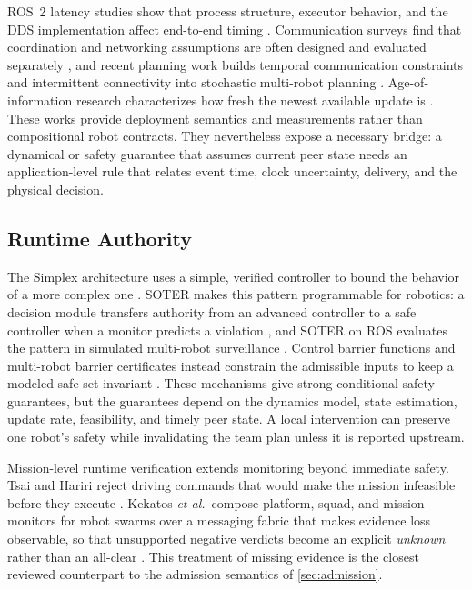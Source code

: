 ROS~2 latency studies show that process structure, executor behavior, and the
DDS implementation affect end-to-end timing
\cite{maruyama2016ros2,kronauer2021latency}.  Communication surveys find that
coordination and networking assumptions are often designed and evaluated
separately \cite{gielis2022communications}, and recent planning work builds
temporal communication constraints and intermittent connectivity into
stochastic multi-robot planning \cite{silva2026probabilistic}.  Age-of-information
research characterizes how fresh the newest available update is
\cite{kaul2012aoi}.  These works provide deployment semantics and measurements
rather than compositional robot contracts.  They nevertheless expose a necessary
bridge: a dynamical or safety guarantee that assumes current peer state needs an
application-level rule that relates event time, clock uncertainty, delivery, and
the physical decision.

\subsection{Runtime Authority}

The Simplex architecture uses a simple, verified controller to bound the
behavior of a more complex one \cite{sha2001simplex}.  SOTER makes this pattern
programmable for robotics: a decision module transfers authority from an
advanced controller to a safe controller when a monitor predicts a violation
\cite{desai2019soter}, and SOTER on ROS evaluates the pattern in simulated
multi-robot surveillance \cite{shivakumar2020soterros}.  Control barrier
functions and multi-robot barrier certificates instead constrain the admissible
inputs to keep a modeled safe set invariant \cite{ames2017cbf,wang2017barrier}.
These mechanisms give strong conditional safety guarantees, but the guarantees
depend on the dynamics model, state estimation, update rate, feasibility, and
timely peer state.  A local intervention can preserve one robot's safety while
invalidating the team plan unless it is reported upstream.

Mission-level runtime verification extends monitoring beyond immediate safety.
Tsai and Hariri reject driving commands that would make the mission infeasible
before they execute \cite{tsai2026missionrta}.  Kekatos \emph{et al.}\ compose
platform, squad, and mission monitors for robot swarms over a messaging fabric
that makes evidence loss observable, so that unsupported negative verdicts
become an explicit \emph{unknown} rather than an all-clear
\cite{kekatos2026swarmrta}.  This treatment of missing evidence is the closest
reviewed counterpart to the admission semantics of \cref{sec:admission}.

